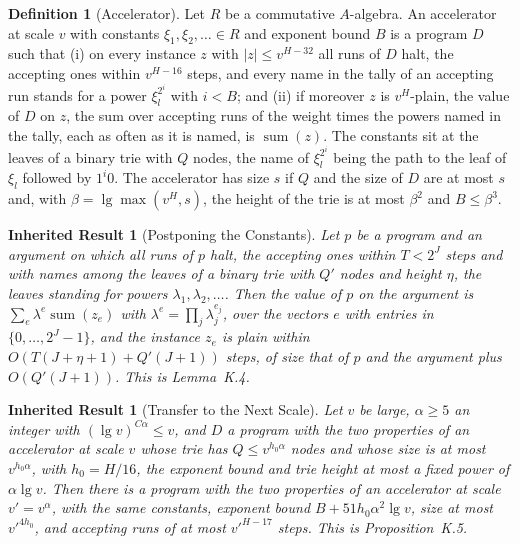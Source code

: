 \documentclass[11pt,letterpaper]{report}
\theoremstyle{plain}
\newtheorem{inherited}[theorem]{Inherited Result}
\theoremstyle{definition}
\newtheorem{definition}[theorem]{Definition}
\theoremstyle{remark}
\begin{document}
\begin{definition}[Accelerator]\label{def:accel}
Let $R$ be a commutative $A$-algebra. An accelerator at scale $v$ with constants $\xi_1,\xi_2,\ldots\in R$ and exponent bound $B$ is a program $D$ such that (i) on every instance $z$ with $|z|\le v^{H-32}$ all runs of $D$ halt, the accepting ones within $v^{H-16}$ steps, and every name in the tally of an accepting run stands for a power $\xi_l^{2^i}$ with $i<B$; and (ii) if moreover $z$ is $v^H$-plain, the value of $D$ on $z$, the sum over accepting runs of the weight times the powers named in the tally, each as often as it is named, is $\operatorname{sum}(z)$. The constants sit at the leaves of a binary trie with $Q$ nodes, the name of $\xi_l^{2^i}$ being the path to the leaf of $\xi_l$ followed by $1^i0$. The accelerator has size $s$ if $Q$ and the size of $D$ are at most $s$ and, with $\beta=\lg\max(v^H,s)$, the height of the trie is at most $\beta^2$ and $B\le\beta^3$.
\end{definition}

\begin{inherited}[Postponing the Constants]\label{inh:postpone}
Let $p$ be a program and an argument on which all runs of $p$ halt, the accepting ones within $T<2^J$ steps and with names among the leaves of a binary trie with $Q'$ nodes and height $\eta$, the leaves standing for powers $\lambda_1,\lambda_2,\ldots$. Then the value of $p$ on the argument is $\sum_e\lambda^e\operatorname{sum}(z_e)$ with $\lambda^e=\prod_j\lambda_j^{e_j}$, over the vectors $e$ with entries in $\{0,\ldots,2^J-1\}$, and the instance $z_e$ is plain within $O(T(J+\eta+1)+Q'(J+1))$ steps, of size that of $p$ and the argument plus $O(Q'(J+1))$. This is Lemma~K.4.
\end{inherited}

\begin{inherited}[Transfer to the Next Scale]\label{inh:transfer}
Let $v$ be large, $\alpha\ge5$ an integer with $(\lg v)^{C\alpha}\le v$, and $D$ a program with the two properties of an accelerator at scale $v$ whose trie has $Q\le v^{h_0\alpha}$ nodes and whose size is at most $v^{h_0\alpha}$, with $h_0=H/16$, the exponent bound and trie height at most a fixed power of $\alpha\lg v$. Then there is a program with the two properties of an accelerator at scale $v'=v^{\alpha}$, with the same constants, exponent bound $B+51h_0\alpha^2\lg v$, size at most $v'^{4h_0}$, and accepting runs of at most $v'^{H-17}$ steps. This is Proposition~K.5.
\end{inherited}
\end{document}
